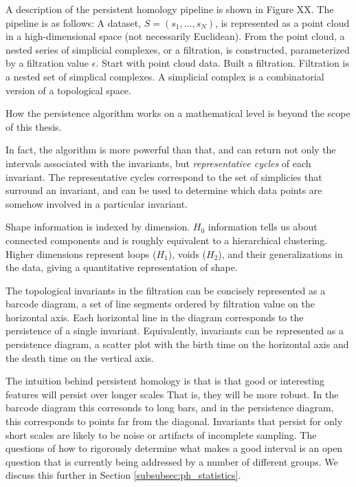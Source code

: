A description of the persistent homology pipeline is shown in Figure XX.
The pipeline is as follows:
A dataset, $S=(s_{1},\ldots,s_{N})$, is represented as a point cloud in a high-dimensional space (not necessarily Euclidean).
From the point cloud, a nested series of simplicial complexes, or a filtration, is constructed, parameterized by a filtration value $\epsilon$.
Start with point cloud data.
Built a filtration.
Filtration is a nested set of simplical complexes.
A simplicial complex is a combinatorial version of a topological space.

How the persistence algorithm works on a mathematical level is beyond the scope of this thesis.

In fact, the algorithm is more powerful than that, and can return not only the intervals associated with the invariants, but \emph{representative cycles} of each invariant.
The representative cycles correspond to the set of simplicies that surround an invariant, and can be used to determine which data points are somehow involved in a particular invariant.

Shape information is indexed by dimension. $H_0$ information tells us about connected components and is roughly equivalent to a hierarchical clustering.
Higher dimensions represent loops ($H_1$), voids ($H_2$), and their generalizations in the data, giving a quantitative representation of shape.

The topological invariants in the filtration can be concisely represented as a barcode diagram, a set of line segments ordered by filtration value on the horizontal axis.
Each horizontal line in the diagram corresponds to the persistence of a single invariant.
Equivalently, invariants can be represented as a persistence diagram, a scatter plot with the birth time on the horizontal axis and the death time on the vertical axis.
\kje{[Figure.]}

The intuition behind persistent homology is that is that good or interesting features will persist over longer scales
That is, they will be more robust.
In the barcode diagram this corresonds to long bars, and in the persistence diagram, this corresponds to points far from the diagonal.
Invariants that persist for only short scales are likely to be noise or artifacts of incomplete sampling.
The questions of how to rigorously determine what makes a good interval is an open question that is currently being addressed by a number of different groups.
We discuss this further in Section \ref{subsubsec:ph_statistics}.

